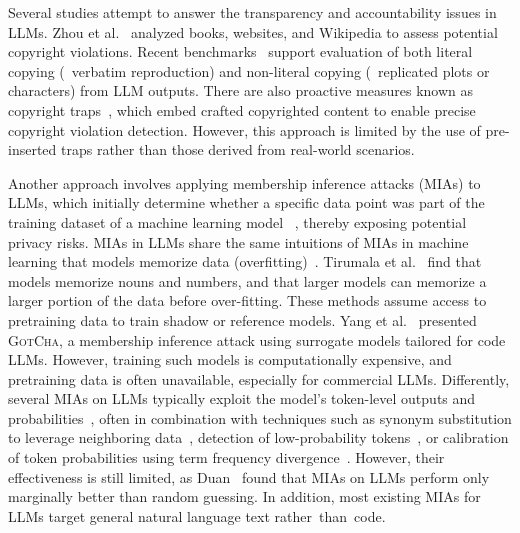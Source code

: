 Several studies attempt to answer the transparency and accountability issues in LLMs. Zhou et al.~\cite{zhou2024dpdllm} analyzed books, websites, and Wikipedia to assess potential copyright violations. Recent benchmarks~\cite{chen2024copybench, liu2024shield} support evaluation of both literal copying (\eg~verbatim reproduction) and non-literal copying (\eg~replicated plots or characters) from LLM outputs. There are also proactive measures known as copyright traps~\cite{shilov2024mosaic, meeus2024copyright}, which embed crafted copyrighted content to enable precise copyright violation detection. However, this approach is limited by the use of pre-inserted traps rather than those derived from real-world scenarios.



Another approach involves applying membership inference attacks (MIAs) to LLMs, which initially determine whether a specific data point was part of the training dataset of a machine learning model
~\cite{shokri2017membership, song2021systematic, song2019privacy, huang2024general, yeom2018privacy, leino2020stolen, long2018understanding, nasr2019comprehensive, sablayrolles2019white, salem2018ml, truex2019demystifying}, thereby exposing potential privacy risks. 
MIAs in LLMs share the same intuitions of MIAs in machine learning that models memorize data (overfitting)~\cite{song2019auditing, carlini2021extracting, tirumala2022memorization}. Tirumala et al.~\cite{tirumala2022memorization} find that models memorize nouns and numbers, and that larger models can memorize a larger portion of the data before over-fitting. 
These methods assume access to pretraining data to train shadow or reference models. Yang et al.~\cite{yang2024gotcha} presented \textsc{GotCha}, a membership inference attack using surrogate models tailored for code LLMs.
However, training such models is computationally expensive, and pretraining data is often unavailable, especially for commercial LLMs.
Differently, several MIAs on LLMs typically exploit the model's token-level outputs and probabilities~\cite{carlini2021extracting}, often in combination with techniques such as synonym substitution to leverage neighboring data~\cite{mattern2023membership}, detection of low-probability tokens~\cite{shi2023detecting}, or calibration of token probabilities using term frequency divergence~\cite{zhang2024pretraining}. 
However, their effectiveness is still limited, as Duan~\cite{duan2024membership} found that MIAs on LLMs perform only marginally better than random guessing. In addition, most existing MIAs for LLMs target general natural language text rather~than~code.

